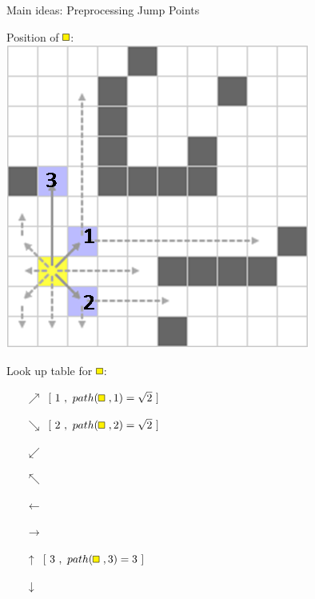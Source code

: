 \documentclass{presentation}
\begin{document}
\begin{frame}
\end{frame}



\begin{frame}{Main ideas: Preprocessing Jump Points}
	\begin{minipage}{0.45\textwidth}
		Position of $\tikz{\path[draw=black,fill=yellow] (0,0) rectangle (2mm,2mm);}$:\\
		\vspace{3mm}
		\includegraphics[width=\textwidth]{figures/jps_geschnitten/1(yellow).png}
	\end{minipage}%
	\hfill%
	\begin{minipage}{0.45\textwidth}
		Look up table for $\tikz{\path[draw=black,fill=yellow] (0,0) rectangle (2mm,2mm);}$:\\
		\vspace{3mm}
		\begin{itemize}
		\pause
		\item[$\nearrow$] $[\ 1\ ,\ path(\tikz{\path[draw=black,fill=yellow] (0,0) rectangle (2mm,2mm);}\ ,1)=\sqrt{2}\ ]$
		\pause
		\item[$\searrow$] $[\ 2\ ,\ path(\tikz{\path[draw=black,fill=yellow] (0,0) rectangle (2mm,2mm);}\ ,2)=\sqrt{2}\ ]$
		\item[$\swarrow$]
		\item[$\nwarrow$]
		\item[$\leftarrow$]
		\item[$\rightarrow$]
		\pause
		\item[$\uparrow$] $[\ 3\ ,\ path(\tikz{\path[draw=black,fill=yellow] (0,0) rectangle (2mm,2mm);}\ ,3)=3\ ]$
		\item[$\downarrow$]
		\end{itemize}
	\end{minipage}
\end{frame}
\end{document}
